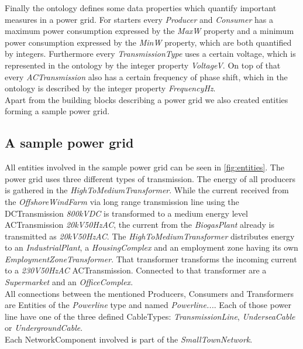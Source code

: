 Finally the ontology defines some data properties which quantify important measures in a power grid.
For starters every \textit{Producer} and \textit{Consumer} has a maximum power consumption expressed by the \textit{MaxW} property and a minimum power consumption expressed by the \textit{MinW} property, which are both quantified by integers. Furthermore every \textit{TransmissionType} uses a certain voltage, which is represented in the ontology by the integer property \textit{VoltageV}.
On top of that every \textit{ACTransmission} also has a certain frequency of phase shift, which in the ontology is described by the integer property \textit{FrequencyHz}. \\
Apart from the building blocks describing a power grid we also created entities forming a sample power grid. 

\subsection{A sample power grid}

All entities involved in the sample power grid can be seen in \ref{fig:entities}. The power grid uses three different types of transmission. The energy of all producers is gathered in the \textit{HighToMediumTransformer}. While the current received from the \textit{OffshoreWindFarm} via long range transmission line using the DCTransmission \textit{800kVDC} is transformed to a medium energy level ACTransmission \textit{20kV50HzAC}, the current from the \textit{BiogasPlant} already is transmitted as \textit{20kV50HzAC}. The \textit{HighToMediumTransformer} distributes energy to an \textit{IndustrialPlant}, a \textit{HousingComplex} and an employment zone having its own \textit{EmploymentZoneTransformer}. That transformer transforms the incoming current to a \textit{230V50HzAC} ACTransmission. Connected to that transformer are a \textit{Supermarket} and an
\textit{OfficeComplex}. \\
All connections between the mentioned Producers, Consumers and Transformers are Entities of the \textit{Powerline} type and named \textit{Powerline...}. Each of those power line have one of the three defined CableTypes: \textit{TransmissionLine}, \textit{UnderseaCable} or \textit{UndergroundCable}. \\
Each NetworkComponent involved is part of the \textit{SmallTownNetwork}.   

